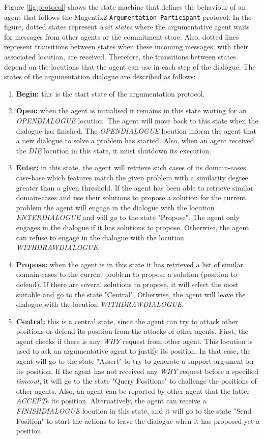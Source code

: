Figure \ref{fig:protocol} shows the state machine that defines the behaviour of an agent that follows the Magentix2 \texttt{Argumentation\_Participant} protocol. In the figure, dotted states represent \emph{wait states} where the argumentative agent waits for messages from other agents or the commitment store. Also, dotted lines represent transitions between states when these incoming messages, with their associated locution, are received. Therefore, the transitions between states depend on the locutions that the agent can use in each step of the dialogue. The states of the argumentation dialogue are described as follows:
\begin{enumerate}
 \item \textbf{Begin:} this is the start state of the argumentation protocol.
 \item \textbf{Open:} when the agent is initialised it remains in this state waiting for an \emph{OPENDIALOGUE} locution. The agent will move back to this state when the dialogue has finished. The \emph{OPENDIALOGUE} locution inform the agent that a new dialogue to solve a problem has started. Also, when an agent received the \emph{DIE} locution in this state, it must shutdown its execution.
 \item \textbf{Enter:} in this state, the agent will retrieve such cases of its domain-cases case-base which features match the given problem with a similarity degree greater than a given threshold. If the agent has been able to retrieve similar domain-cases and use their solutions to propose a solution for the current problem the agent will engage in the dialogue with the locution \emph{ENTERDIALOGUE} and will go to the state "Propose". The agent only engages in the dialogue if it has solutions to propose. Otherwise, the agent can refuse to engage in the dialogue with the locution \emph{WITHDRAWDIALOGUE}.
 \item \textbf{Propose:} when the agent is in this state it has retrieved a list of similar domain-cases to the current problem to propose a solution (position to defend). If there are several solutions to propose, it will select the most suitable and go to the state "Central". Otherwise, the agent will leave the dialogue with the locution \emph{WITHDRAWDIALOGUE}.
 \item \textbf{Central:} this is a central state, since the agent can try to attack other positions or defend its position from the attacks of other agents. First, the agent checks if there is any \emph{WHY} request from other agent. This locution is used to ask an argumentative agent to justify its position. In that case, the agent will go to the state "Assert" to try to generate a support argument for its position. If the agent has not received any \emph{WHY} request before a specified \emph{timeout}, it will go to the state "Query Positions" to challenge the positions of other agents. Also, an agent can be reported by other agent that the latter \emph{ACCEPT}s its position. Alternatively, the agent can receive a \emph{FINISHDIALOGUE} locution in this state, and it will go to the state "Send Position" to start the actions to leave the dialogue when it has proposed yet a position.

\end{enumerate}
